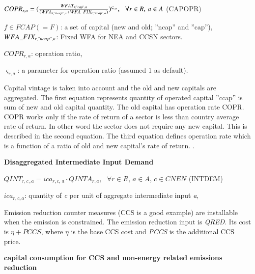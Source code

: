 \documentclass[10pt,a4paper,titlepage,dvipdfmx]{book}
\newif\ifAIMHubReviewMode
\newenvironment{changedblock}{\begingroup\ifAIMHubReviewMode\color{red}\fi}{\endgroup}
\begin{document}
\begin{center}$COPR_{r,a}=(\frac{WFAT_{r,"cap",a}}{(WFA_{r,"ncap",a}+WFA\_FIX_{r,"ncap",a})})^{{\varsigma _{r,a}}},\,\,\,\,\forall r\in R,\,a\in A$ (CAPOPR)
\end{center}

$f\in FCAP\left(=F\right)$: a set of capital (new and old; ''ncap'' and ''cap''),
$WFA\_FIX_{r,"ncap",a}$: Fixed WFA for NEA and CCSN sectors. 

\begin{flushleft}
$COPR_{r,a}$: operation ratio,

$\varsigma _{r,a}$: a parameter for operation ratio (assumed 1 as default).\\
\end{flushleft}

Capital vintage is taken into account and the old and new capitals are aggregated. The first equation represents quantity of operated capital ''ccap'' is sum of new and old capital quantity. The old capital has operation rate COPR. COPR works only if the rate of return of a sector is less than country average rate of return. In other word the sector does not require any new capital. This is described in the second equation. The third equation defines operation rate which is a function of a ratio of old and new capital's rate of return. .

\begin{flushleft}\textbf{Disaggregated Intermediate Input Demand}\end{flushleft}


\begin{center}$QINT_{r,c\,,a}=ica_{r,c,\,a}\cdot QINTA_{r,a},\,\,\,\,\forall r\in R,\,a\in A,\,c\in CNEN$ (INTDEM)
\end{center}

\begin{flushleft} $ica_{r,c,a}$: quantity of \textit{c} per unit of aggregate intermediate input \textit{a}, \end{flushleft}

\begin{changedblock}
Emission reduction counter measures (CCS is a good example) are installable when the emission is constrained. The emission reduction input is \textit{QRED}. Its cost is ${\eta}+PCCS$, where ${\eta}$ is the base CCS cost and \textit{PCCS} is the additional CCS price.
\end{changedblock}

\begin{flushleft}\textbf{capital consumption for CCS and non-energy related emissions reduction}\end{flushleft}
\end{document}
